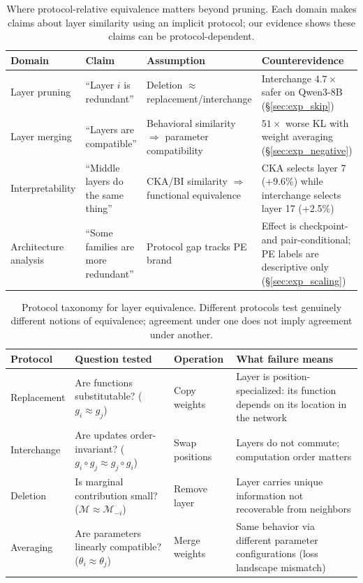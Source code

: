 \begin{table}[htbp]
\centering
\caption{Where protocol-relative equivalence matters beyond pruning. Each domain makes claims about layer similarity using an implicit protocol; our evidence shows these claims can be protocol-dependent.}
\label{tab:domains}
\small
\setlength{\extrarowheight}{3pt}
\setlength{\tabcolsep}{6pt}
\begin{tabularx}{\textwidth}{@{}>{\raggedright\arraybackslash}p{2.05cm}>{\raggedright\arraybackslash}X>{\raggedright\arraybackslash}X>{\raggedright\arraybackslash}X@{}}
\toprule
\textbf{Domain} & \textbf{Claim} & \textbf{Assumption} & \textbf{Counterevidence} \\
\midrule
Layer pruning & ``Layer $i$ is redundant'' & Deletion $\approx$ replacement/interchange & Interchange $4.7\times$ safer on Qwen3-8B (\S\ref{sec:exp_skip}) \\
Layer merging & ``Layers are compatible'' & Behavioral similarity $\Rightarrow$ parameter compatibility & $51\times$ worse KL with weight averaging (\S\ref{sec:exp_negative}) \\
Interpretability & ``Middle layers do the same thing'' & CKA/BI similarity $\Rightarrow$ functional equivalence & CKA selects layer 7 (+9.6\%) while interchange selects layer 17 (+2.5\%) \\
Architecture analysis & ``Some families are more redundant'' & Protocol gap tracks PE brand & Effect is checkpoint- and pair-conditional; PE labels are descriptive only (\S\ref{sec:exp_scaling}) \\
\bottomrule
\end{tabularx}
\end{table}

\begin{table}[htbp]
\centering
\caption{Protocol taxonomy for layer equivalence. Different protocols test genuinely different notions of equivalence; agreement under one does not imply agreement under another.}
\label{tab:protocol_taxonomy}
\begin{tabular}{>{\raggedright\arraybackslash}p{1.8cm}>{\raggedright\arraybackslash}p{3.8cm}>{\raggedright\arraybackslash}p{1.8cm}>{\raggedright\arraybackslash}p{4.5cm}}
\toprule
\textbf{Protocol} & \textbf{Question tested} & \textbf{Operation} & \textbf{What failure means} \\
\midrule
Replacement & Are functions substitutable? ($g_i \approx g_j$) & Copy weights & Layer is position-specialized: its function depends on its location in the network \\
Interchange & Are updates order-invariant? ($g_i \circ g_j \approx g_j \circ g_i$) & Swap positions & Layers do not commute; computation order matters \\
Deletion & Is marginal contribution small? ($\mathcal{M} \approx \mathcal{M}_{-i}$) & Remove layer & Layer carries unique information not recoverable from neighbors \\
Averaging  & Are parameters linearly compatible? ($\theta_i \approx \theta_j$) & Merge weights & Same behavior via different parameter configurations (loss landscape mismatch) \\
\bottomrule
\end{tabular}
\end{table}

